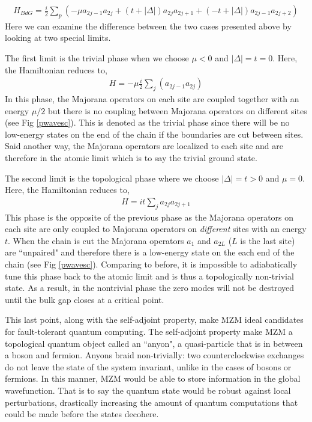 \begin{align}
	H_{BdG} = \frac{i}{2}\sum_{p}\left(-\mu a_{2j-1}a_{2j}+(t+|\Delta|)a_{2j}a_{2j+1}+(-t+|\Delta|)a_{2j-1}a_{2j+2}\right)
\end{align}
Here we can examine the difference between the two cases presented above by looking at two special limits.\par 
The first limit is the trivial phase when we choose $\mu < 0$ and $|\Delta|=t=0$. Here, the Hamiltonian reduces to,
\begin{align}
	H = -\mu\frac{i}{2}\sum_{j}(a_{2j-1}a_{2j})
\end{align}
In this phase, the Majorana operators on each site are coupled together with an energy $\mu/2$ but there is no coupling between Majorana operators on different sites (see Fig \ref{pwavesc}). This is denoted as the trivial phase since there will be no low-energy states on the end of the chain if the boundaries are cut between sites. Said another way, the Majorana operators are localized to each site and are therefore in the atomic limit which is to say the trivial ground state.\par 
The second limit is the topological phase where we choose $|\Delta|=t>0$ and $\mu=0$. Here, the Hamiltonian reduces to,
\begin{align}
	H=it\sum_{j}a_{2j}a_{2j+1}
\end{align}
This phase is the opposite of the previous phase as the Majorana operators on each site are only coupled to Majorana operators on \textit{different} sites with an energy $t$. When the chain is cut the Majorana operators $a_{1}$ and $a_{2L}$ ($L$ is the last site) are ``unpaired" and therefore there is a low-energy state on the each end of the chain (see Fig \ref{pwavesc}). Comparing to before, it is impossible to adiabatically tune this phase back to the atomic limit and is thus a topologically non-trivial state. As a result, in the nontrivial phase the zero modes will not be destroyed until the bulk gap closes at a critical point.\par 
This last point, along with the self-adjoint property, make \ac{MZM} ideal candidates for fault-tolerant quantum computing. The self-adjoint property make \ac{MZM} a topological quantum object called an ``anyon", a quasi-particle that is in between a boson and fermion. Anyons braid non-trivially: two counterclockwise exchanges do not leave the state of the system invariant, unlike in the cases of bosons or fermions\cite{Sarma2015, Knapp2019}. In this manner, \ac{MZM} would be able to store information in the global wavefunction. That is to say the quantum state would be robust against local perturbations, drastically increasing the amount of quantum computations that could be made before the states decohere.\par 
